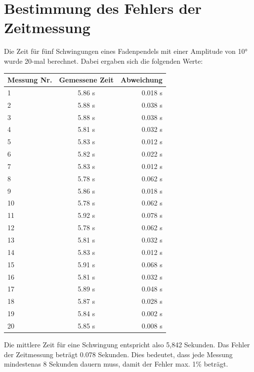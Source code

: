 \documentclass[12pt, a4paper, twoside]{article}
\begin{document}
    \section{Bestimmung des Fehlers der Zeitmessung}
    Die Zeit für fünf Schwingungen eines Fadenpendels mit einer Amplitude von 10° wurde 20-mal berechnet. Dabei ergaben sich die folgenden Werte:
    \\
    
      \begin{center}
    \begin{tabular}{l|c|r} %
      \textbf{Messung Nr.} & \textbf{Gemessene Zeit} & \textbf{Abweichung}\\
    
      \hline 
      1 & 5.86 s & 0.018 s \\
      2 & 5.88 s & 0.038 s \\
      3 & 5.88 s & 0.038 s \\
      4 & 5.81 s & 0.032 s \\
      5 & 5.83 s& 0.012 s \\
      6 & 5.82 s & 0.022 s \\
      7 & 5.83 s & 0.012 s \\
      8 & 5.78 s & 0.062 s \\
      9 & 5.86 s & 0.018 s \\
      10 & 5.78 s & 0.062 s \\
      11 & 5.92 s & 0.078 s \\
      12 & 5.78 s & 0.062 s \\
      13 & 5.81 s & 0.032 s \\
      14 & 5.83 s & 0.012 s \\
      15 & 5.91 s & 0.068 s \\
      16 & 5.81 s & 0.032 s \\
      17 & 5.89 s & 0.048 s \\
      18 & 5.87 s & 0.028 s \\
      19 & 5.84 s & 0.002 s \\
      20 & 5.85 s & 0.008 s \\

    \end{tabular}
  \end{center}
    Die mittlere Zeit für eine Schwingung entspricht also 5,842 Sekunden.
    Das Fehler der Zeitmessung beträgt 0.078 Sekunden. Dies bedeutet, dass jede Messung mindestenas 8 Sekunden dauern muss, damit der Fehler max. 1\% beträgt.
    \newpage
\end{document}
